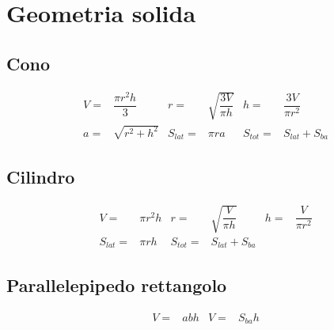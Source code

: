 \chapter{Geometria solida}
\section{Cono}
\begin{tcolorbox}[sidebyside,righthand width=9cm,colback=white,colframe=white,fonttitle=\bfseries	]
	
	\tcblower
	\begin{align}
V=&\dfrac{\pi r^2h}{3}&r=&\sqrt{\dfrac{3V}{\pi h}}&h=&\dfrac{3V}{\pi r^2}\\
a=&\sqrt{r^2+h^2}&S_{lat}=&\pi r a&S_{tot}=&S_{lat}+S_{ba}
	\end{align}
\end{tcolorbox}
\section{Cilindro}
\begin{tcolorbox}[sidebyside,righthand width=9cm,colback=white,colframe=white,fonttitle=\bfseries	]
	
	\tcblower
	\begin{align}
	V=&\pi r^2h&r=&\sqrt{\dfrac{V}{\pi h}}&h=&\dfrac{V}{\pi r^2}\\
	S_{lat}=&\pi r h&S_{tot}=&S_{lat}+S_{ba}
	\end{align}
\end{tcolorbox}
\section{Parallelepipedo rettangolo}
\begin{tcolorbox}[sidebyside,righthand width=9cm,colback=white,colframe=white,fonttitle=\bfseries	]
	
	\tcblower
	\begin{align}
	V=&abh&V=&S_{ba}h
	\end{align}
\end{tcolorbox}